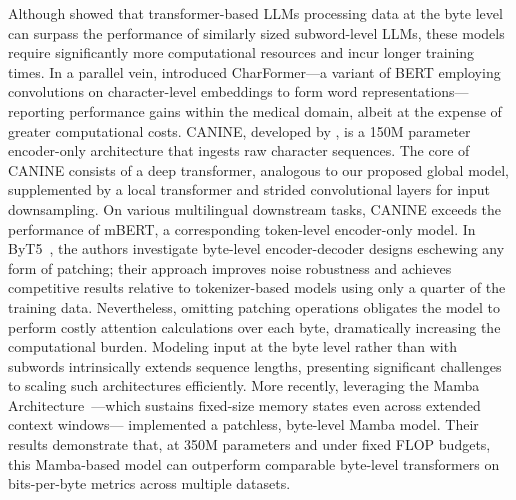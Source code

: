 Although \cite{Choe2019BridgingTG} showed that transformer-based LLMs processing data at the byte level can surpass the performance of similarly sized subword-level LLMs, these models require significantly more computational resources and incur longer training times. In a parallel vein, \cite{el2020characterbert} introduced CharFormer—a variant of BERT employing convolutions on character-level embeddings to form word representations—reporting performance gains within the medical domain, albeit at the expense of greater computational costs. CANINE, developed by \cite{clark2022canine}, is a 150M parameter encoder-only architecture that ingests raw character sequences. The core of CANINE consists of a deep transformer, analogous to our proposed global model, supplemented by a local transformer and strided convolutional layers for input downsampling. On various multilingual downstream tasks, CANINE exceeds the performance of mBERT, a corresponding token-level encoder-only model. In ByT5~\citep{xue2022byt5}, the authors investigate byte-level encoder-decoder designs eschewing any form of patching; their approach improves noise robustness and achieves competitive results relative to tokenizer-based models using only a quarter of the training data. Nevertheless, omitting patching operations obligates the model to perform costly attention calculations over each byte, dramatically increasing the computational burden. Modeling input at the byte level rather than with subwords intrinsically extends sequence lengths, presenting significant challenges to scaling such architectures efficiently. More recently, leveraging the Mamba Architecture~\citep{gu2023mamba}—which sustains fixed-size memory states even across extended context windows—\cite{wang2024mambabyte} implemented a patchless, byte-level Mamba model. Their results demonstrate that, at 350M parameters and under fixed FLOP budgets, this Mamba-based model can outperform comparable byte-level transformers on bits-per-byte metrics across multiple datasets.

